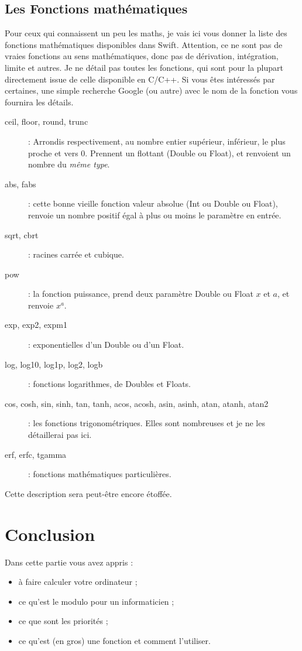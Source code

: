 \subsection{Les Fonctions mathématiques}

Pour ceux qui connaissent un peu les maths, je vais ici vous donner la liste des fonctions mathématiques disponibles dans Swift. Attention, ce ne sont pas de vraies fonctions au sens mathématiques, donc pas de dérivation, intégration, limite et autres.
Je ne détail pas toutes les fonctions, qui sont pour la plupart directement issue de celle disponible en C/C++.
Si vous êtes intéressés par certaines, une simple recherche Google (ou autre) avec le nom de la fonction vous fournira les détails.
\begin{description}
\item[ceil, floor, round, trunc]
: Arrondis respectivement, au nombre entier supérieur, inférieur, le plus proche et vers 0. Prennent un flottant (Double ou Float), et renvoient un nombre du \emph{même type}.
\item[abs, fabs]
: cette bonne vieille fonction valeur absolue (Int ou Double ou Float), renvoie un nombre positif égal à plus ou moins le paramètre en entrée.
\item[sqrt, cbrt]
: racines carrée et cubique.
\item[pow]
: la fonction puissance, prend deux paramètre Double ou Float $x$ et $a$, et renvoie $x^{a}$. %
\item[exp, exp2, expm1]
: exponentielles d'un Double ou d'un Float.
\item[log, log10, log1p, log2, logb]
: fonctions logarithmes, de Doubles et Floats.
\item[cos, cosh, sin, sinh, tan, tanh, acos, acosh, asin, asinh, atan, atanh, atan2]
: les fonctions trigonométriques. Elles sont nombreuses et je ne les détaillerai pas ici.
\item[erf, erfc, tgamma]
: fonctions mathématiques particulières.
\end{description}
Cette description sera peut-être encore étoffée.
\section*{Conclusion}
{}
Dans cette partie vous avez appris :
\begin{itemize}
\item à faire calculer votre ordinateur ;
\item ce qu'est le modulo pour un informaticien ;
\item ce que sont les priorités ;
\item ce qu'est (en gros) une fonction et comment l'utiliser.
\end{itemize}
